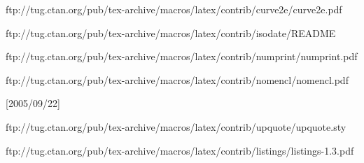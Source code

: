 ftp://tug.ctan.org/pub/tex-archive/macros/latex/contrib/curve2e/curve2e.pdf
%



\usepackage{makeidx} %
\IfDraft{
\usepackage{showidx} %
}

ftp://tug.ctan.org/pub/tex-archive/macros/latex/contrib/isodate/README

ftp://tug.ctan.org/pub/tex-archive/macros/latex/contrib/numprint/numprint.pdf

ftp://tug.ctan.org/pub/tex-archive/macros/latex/contrib/nomencl/nomencl.pdf
\usepackage[%
german,
]{nomencl}[2005/09/22]

\usepackage[
footnote, %
smaller, %
printonlyused %
]{acronym}


ftp://tug.ctan.org/pub/tex-archive/macros/latex/contrib/upquote/upquote.sty
\usepackage{upquote} %



ftp://tug.ctan.org/pub/tex-archive/macros/latex/contrib/listings/listings-1.3.pdf


